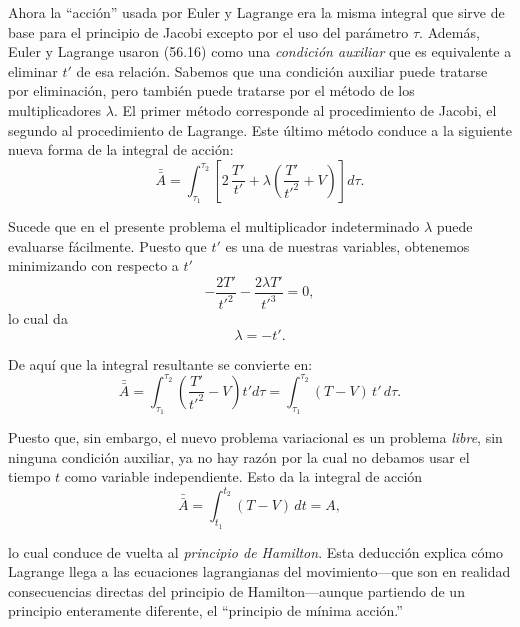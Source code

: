 \documentclass[12pt,a4paper]{book}
\begin{document}
Ahora la ``acción'' usada por Euler y Lagrange era la misma integral que sirve de base para el principio de Jacobi excepto por el uso del parámetro $\tau$. Además, Euler y Lagrange usaron (56.16) como una \textit{condición auxiliar} que es equivalente a eliminar $t'$ de esa relación. Sabemos que una condición auxiliar puede tratarse por eliminación, pero también puede tratarse por el método de los multiplicadores $\lambda$. El primer método corresponde al procedimiento de Jacobi, el segundo al procedimiento de Lagrange. Este último método conduce a la siguiente nueva forma de la integral de acción:
\begin{equation}
\bar{\bar{A}} = \int_{\tau_1}^{\tau_2} \left[2\,\frac{T'}{t'} + \lambda\left(\frac{T'}{t'^2} + V\right)\right] d\tau. \tag{56.17}
\end{equation}

Sucede que en el presente problema el multiplicador indeterminado $\lambda$ puede evaluarse fácilmente. Puesto que $t'$ es una de nuestras variables, obtenemos minimizando con respecto a $t'$
\begin{equation}
-\frac{2T'}{t'^2} - \frac{2\lambda T'}{t'^3} = 0, \tag{56.18}
\end{equation}
lo cual da
\begin{equation}
\lambda = -t'. \tag{56.19}
\end{equation}

De aquí que la integral resultante se convierte en:
\begin{equation}
\bar{\bar{A}} = \int_{\tau_1}^{\tau_2} \left(\frac{T'}{t'^2} - V\right) t' d\tau = \int_{\tau_1}^{\tau_2} (T - V)\,t'\,d\tau. \tag{56.20}
\end{equation}

Puesto que, sin embargo, el nuevo problema variacional es un problema \textit{libre}, sin ninguna condición auxiliar, ya no hay razón por la cual no debamos usar el tiempo $t$ como variable independiente. Esto da la integral de acción
\begin{equation}
\bar{\bar{A}} = \int_{t_1}^{t_2} (T - V)\,dt = A, \tag{56.21}
\end{equation}


lo cual conduce de vuelta al \textit{principio de Hamilton}. Esta deducción explica cómo Lagrange llega a las ecuaciones lagrangianas del movimiento---que son en realidad consecuencias directas del principio de Hamilton---aunque partiendo de un principio enteramente diferente, el ``principio de mínima acción.''
\end{document}
